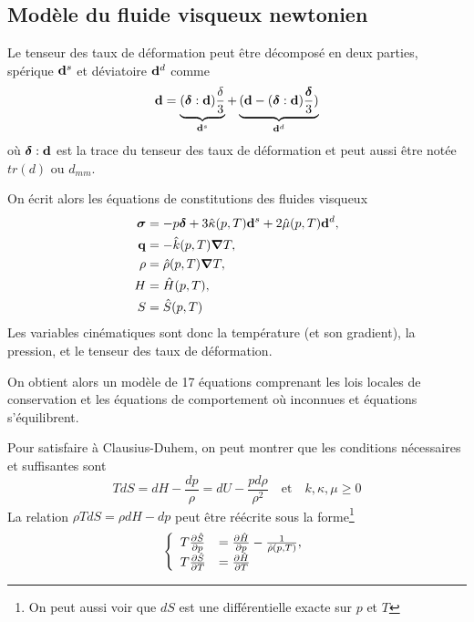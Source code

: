     \subsection{Modèle du fluide visqueux newtonien}
      Le tenseur des taux de déformation peut être décomposé en deux parties, spérique $\vb{d}^s$ et déviatoire $\vb{d}^d$ comme
      \begin{equation}
        \vb{d} = \underbrace{(\boldsymbol{\delta} : \vb{d}) \frac{\delta}{3}}_{\vb{d}^s} + \underbrace{(\vb{d} - (\boldsymbol{\delta}:\vb{d})\frac{\boldsymbol{\delta}}{3})}_{\vb{d}^d}
      \end{equation}
      où $\boldsymbol{\delta} : \vb{d}$ est la trace du tenseur des taux de déformation et peut aussi être notée $tr(d)$ ou $d_{mm}$.

      On écrit alors les équations de constitutions des fluides visqueux
      \begin{equation}
        \begin{aligned}
          \boldsymbol{\sigma} &= -p\boldsymbol{\delta} + 3 \hat{\kappa}(p,T) \vb{d}^s + 2 \hat{\mu}(p,T) \vb{d}^d,\\
          \vb{q} &= - \hat{k}(p, T) \grad T,\\
          \rho &= \hat{\rho}(p,T)\grad T,\\
          H &= \hat{H}(p,T),\\
          S &= \hat{S}(p,T)
        \end{aligned}
      \end{equation}
      Les variables cinématiques sont donc la température (et son gradient), la pression, et le tenseur des taux de déformation.

      On obtient alors un modèle de 17 équations comprenant les lois locales de conservation et les équations de comportement où inconnues et équations s'équilibrent.

      Pour satisfaire à Clausius-Duhem, on peut montrer que les conditions nécessaires et suffisantes sont
      \begin{equation}
        TdS = dH - \frac{dp}{\rho} = dU - \frac{pd\rho}{\rho^2}\quad \textrm{et} \quad k, \kappa, \mu \geq 0
      \end{equation}
      La relation $\rho T dS = \rho dH - dp$ peut être réécrite sous la forme\footnote{On peut aussi voir que $dS$ est une différentielle exacte sur $p$ et $T$}
      \begin{equation}
        \left\{
          \begin{array}{ll}
            T \pdv{\hat{S}}{p}(p,T) &= \pdv{\hat{H}}{p}(p, T) - \frac{1}{\hat{\rho}(p,T)},\\
            T \pdv{\hat{S}}{T}(p,T) &= \pdv{\hat{H}}{T}(p,T)
          \end{array}
        \right.
      \end{equation}

